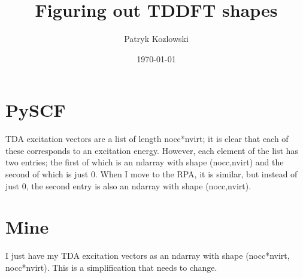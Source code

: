 \documentclass[12pt]{article}
\author{Patryk Kozlowski}
\title{Figuring out TDDFT shapes}
\date{\today}
\begin{document}
\maketitle
\section{PySCF}
TDA excitation vectors are a list of length nocc*nvirt; it is clear that each of these corresponds to an excitation energy. However, each element of the list has two entries; the first of which is an ndarray with shape (nocc,nvirt) and the second of which is just 0. When I move to the RPA, it is similar, but instead of just 0, the second entry is also an ndarray with shape (nocc,nvirt). 
\section{Mine}
I just have my TDA excitation vectors as an ndarray with shape (nocc*nvirt, nocc*nvirt). This is a simplification that needs to change.
\end{document}
